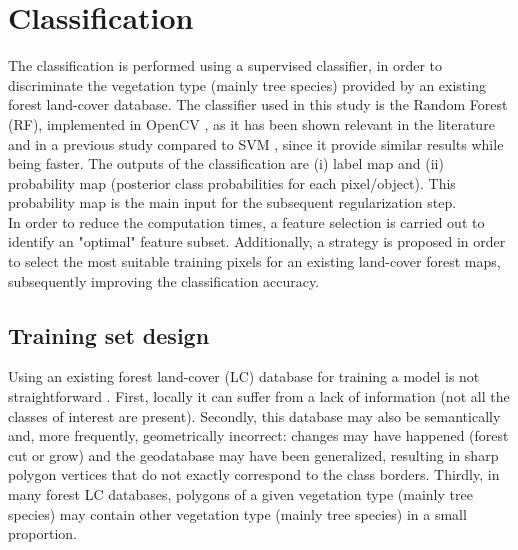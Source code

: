 \section{Classification}
The classification is performed using a supervised classifier, in order to discriminate the vegetation type (mainly tree species) provided by an existing forest land-cover database. The classifier used in this study is the Random Forest (RF), implemented in OpenCV \citep{opencv}, as it has been shown relevant in the literature \citep{belgiu2016random} and in a previous study compared to SVM \citep{dechesne2016forest}, since it provide similar results while being faster. The outputs of the classification are (i) label map and (ii) probability map (posterior class probabilities for each pixel/object). This probability map is the main input for the subsequent regularization step. \\
In order to reduce the computation times, a feature selection is carried out to identify an "optimal" feature subset. Additionally, a strategy is proposed in order to select the most suitable training pixels for an existing land-cover forest maps, subsequently improving the classification accuracy.

\subsection{Training set design}
Using an existing forest land-cover (LC) database for training a model is not straightforward \citep{isprsannals-II-3-W2-13-2013,rs6053965,isprs-annals-III-7-133-2016}. First, locally it can suffer from a lack of information (not all the classes of interest are present). Secondly, this database may also be semantically and, more frequently, geometrically incorrect: changes may have happened (forest cut or grow) and the geodatabase may have been generalized, resulting in sharp polygon vertices that do not exactly correspond to the class borders. Thirdly, in many forest LC databases, polygons of a given vegetation type (mainly tree species) may contain other vegetation type (mainly tree species) in a small proportion.


